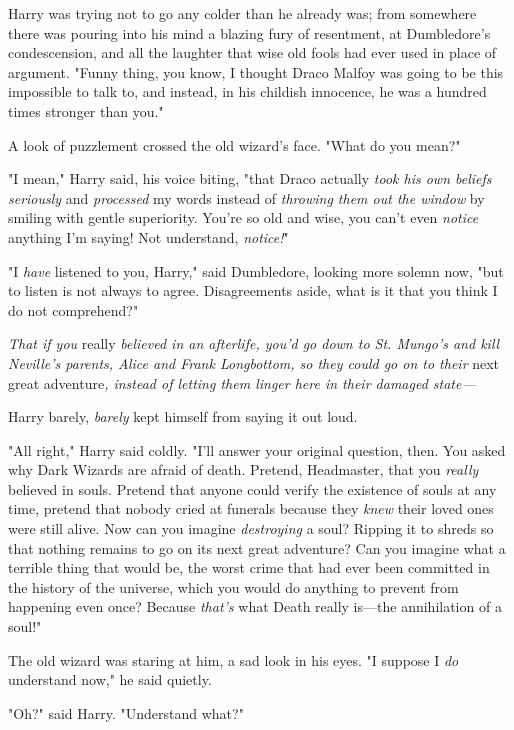 Harry was trying not to go any colder than he already was; from somewhere there 
was pouring into his mind a blazing fury of resentment, at Dumbledore's 
condescension, and all the laughter that wise old fools had ever used in place 
of argument. "Funny thing, you know, I thought Draco Malfoy was going to be 
this impossible to talk to, and instead, in his childish innocence, he was a 
hundred times stronger than you."

A look of puzzlement crossed the old wizard's face. "What do you mean?"

"I mean," Harry said, his voice biting, "that Draco actually \emph{took his own 
beliefs seriously} and \emph{processed} my words instead of \emph{throwing them 
out the window} by smiling with gentle superiority. You're so old and wise, you 
can't even \emph{notice} anything I'm saying! Not understand, \emph{notice!}"

"I \emph{have} listened to you, Harry," said Dumbledore, looking more solemn 
now, "but to listen is not always to agree. Disagreements aside, what is it 
that you think I do not comprehend?"

\emph{That if you} really \emph{believed in an afterlife, you'd go down to St. 
Mungo's and kill Neville's parents, Alice and Frank Longbottom, so they could 
go on to their} next great adventure\emph{, instead of letting them linger here 
in their damaged state---}

Harry barely, \emph{barely} kept himself from saying it out loud.

"All right," Harry said coldly. "I'll answer your original question, then. You 
asked why Dark Wizards are afraid of death. Pretend, Headmaster, that you 
\emph{really} believed in souls. Pretend that anyone could verify the existence 
of souls at any time, pretend that nobody cried at funerals because they 
\emph{knew} their loved ones were still alive. Now can you imagine 
\emph{destroying} a soul? Ripping it to shreds so that nothing remains to go on 
its next great adventure? Can you imagine what a terrible thing that would be, 
the worst crime that had ever been committed in the history of the universe, 
which you would do anything to prevent from happening even once? Because 
\emph{that's} what Death really is---the annihilation of a soul!"

The old wizard was staring at him, a sad look in his eyes. "I suppose I 
\emph{do} understand now," he said quietly.

"Oh?" said Harry. "Understand what?"

